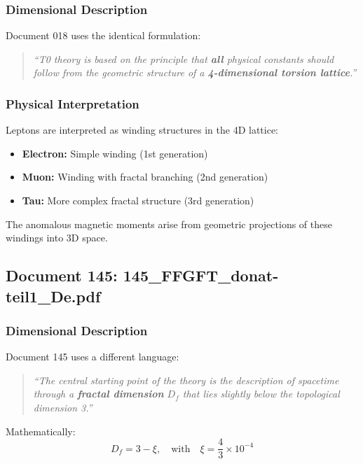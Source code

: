 	\subsubsection{Dimensional Description}
	
	Document 018 uses the identical formulation:
	
	\begin{quote}
		\textit{\enquote{T0 theory is based on the principle that \textbf{all} physical constants should follow from the geometric structure of a \textbf{4-dimensional torsion lattice}.}}
	\end{quote}
	
	\subsubsection{Physical Interpretation}
	
	Leptons are interpreted as winding structures in the 4D lattice:
	\begin{itemize}
		\item \textbf{Electron:} Simple winding (1st generation)
		\item \textbf{Muon:} Winding with fractal branching (2nd generation)
		\item \textbf{Tau:} More complex fractal structure (3rd generation)
	\end{itemize}
	
	The anomalous magnetic moments arise from geometric projections of these windings into 3D space.
	
	\subsection{Document 145: 145\_FFGFT\_donat-teil1\_De.pdf}
	
	\subsubsection{Dimensional Description}
	
	Document 145 uses a different language:
	
	\begin{quote}
		\textit{\enquote{The central starting point of the theory is the description of spacetime through a \textbf{fractal dimension} $D_f$ that lies slightly below the topological dimension 3.}}
	\end{quote}
	
	Mathematically:
	\begin{equation}
		\boxed{D_f = 3 - \xi, \quad \text{with} \quad \xi = \frac{4}{3} \times 10^{-4}}
	\end{equation}
	
